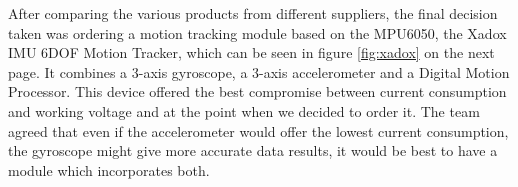 After comparing the various products from different suppliers, the final decision taken was ordering a motion tracking module based on the MPU6050, the Xadox IMU 6DOF Motion Tracker, which can be seen in figure \ref{fig:xadox} on the next page. It combines a 3-axis gyroscope, a 3-axis accelerometer and a Digital Motion Processor. This device offered the best compromise between current consumption and working voltage and at the point when we decided to order it. The team agreed that even if the accelerometer would offer the lowest current consumption, the gyroscope might give more accurate data results, it would be best to have a module which incorporates both.
